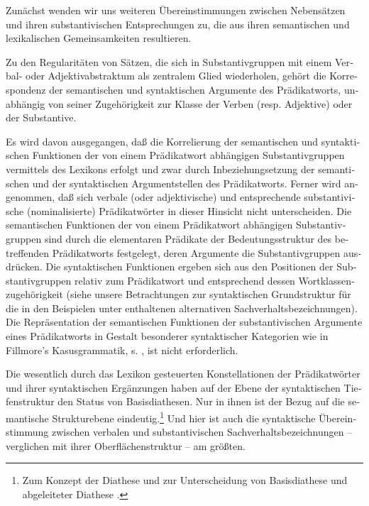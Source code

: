 \documentclass[output=paper]{langscibook}
\begin{document}
\begin{otherlanguage}{german}
Zunächst wenden wir uns weiteren Übereinstimmungen zwischen Neben\-sät\-zen und ihren substantivischen Entsprechungen zu, die aus ihren semantischen und lexikalischen Gemeinsamkeiten resultieren.

Zu den Regularitäten von Sätzen, die sich in Substantivgruppen mit einem Verbal- oder Adjektivabstraktum als zentralem Glied wiederholen, gehört die Kor\-re\-spon\-denz der semantischen und syntaktischen Argumente des Prädikatworts, unabhängig von seiner Zugehörigkeit zur Klasse der Verben (resp. Adjektive) oder der Substantive.

Es wird davon ausgegangen, daß die Korrelierung der semantischen und syntaktischen Funktionen der von einem Prädikatwort abhängigen Substantivgruppen vermittels des Lexikons erfolgt und zwar durch Inbeziehungsetzung der semantischen und der syntaktischen Argumentstellen des Prädikatworts. Ferner wird angenommen, daß sich verbale (oder adjektivische) und entsprechende substantivische (nominalisierte) Prädikatwörter in dieser Hinsicht nicht unterscheiden. Die semantischen Funktionen der von einem Prädikatwort abhängigen Substantivgruppen sind durch die elementaren Prädikate der Bedeutungsstruktur des betreffenden Prädikatworts festgelegt, deren Argumente die Substantivgruppen ausdrücken. Die syntaktischen Funktionen ergeben sich aus den Positionen der Substantivgruppen relativ zum Prädikatwort und entsprechend dessen Wortklassenzugehörigkeit (siehe unsere Betrachtungen zur syntaktischen Grund\-struk\-tur  für die in den Beispielen unter  enthaltenen alternativen Sachverhaltsbezeichnungen). Die Repräsentation der semantischen Funktionen der substantivischen Argumente eines Prädikatworts in Gestalt besonderer syntaktischer Kategorien wie in Fillmore's Kasusgrammatik, s. \textcite{fillmore1968the-case-for-case}, ist nicht erforderlich.

\largerpage
Die wesentlich durch das Lexikon gesteuerten Konstellationen der Prä\-di\-kat\-wör\-ter und ihrer syntaktischen Ergänzungen haben auf der Ebene der syntaktischen Tiefenstruktur den Status von Basisdiathesen. Nur in ihnen ist der Bezug auf die semantische Strukturebene eindeutig.\footnote{Zum Konzept der Diathese und zur Unterscheidung von Basisdiathese und abgeleiteter Diathese \citet{zimmermann1978sintaksiceskie-funkcii-aktantov-zalog-i-perechodnost}.} Und hier ist auch die syntaktische Über\-ein\-stim\-mung zwischen verbalen und substantivischen Sachverhaltsbezeichnungen -- verglichen mit ihrer Oberflächenstruktur -- am größten.


\end{otherlanguage}
\end{document}
